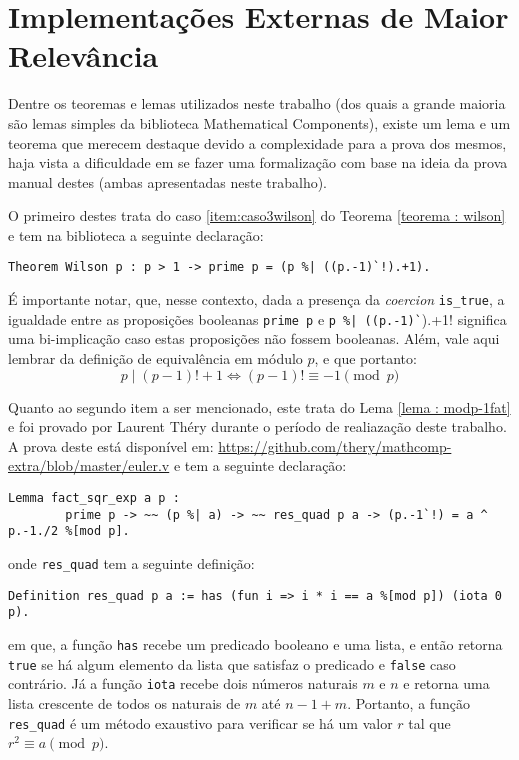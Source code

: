 \section{Implementações Externas de Maior Relevância}
Dentre os teoremas e lemas utilizados neste trabalho (dos quais a grande maioria são lemas simples da biblioteca Mathematical Components), existe um lema e um teorema que merecem destaque devido a complexidade para a prova dos mesmos, haja vista a dificuldade em se fazer uma formalização com base na ideia da prova manual destes (ambas apresentadas neste trabalho).

O primeiro destes trata do caso \ref{item:caso3wilson} do Teorema \ref{teorema : wilson} e tem na biblioteca a seguinte declaração:
\begin{lstlisting}[language=coq]
        Theorem Wilson p : p > 1 -> prime p = (p %| ((p.-1)`!).+1).
\end{lstlisting}
É importante notar, que, nesse contexto, dada a presença da \textit{coercion} \lstinline[language=coq]!is_true!, a igualdade entre as proposições booleanas \lstinline[language=coq]!prime p! e \lstinline[language=coq]!p %| ((p.-1)`!).+1! significa uma bi-implicação caso estas proposições não fossem booleanas. Além, vale aqui lembrar da definição de equivalência em módulo $p$, e que portanto:
\begin{equation}
        p \mid (p-1)! + 1 \Longleftrightarrow (p-1)! \equiv -1 \pmod{p} 
\end{equation}

Quanto ao segundo item a ser mencionado, este trata do Lema \ref{lema : modp-1fat} e foi provado por Laurent Théry durante o período de realiazação deste trabalho. A prova deste está disponível em: \hyperlink{https://github.com/thery/mathcomp-extra/blob/master/euler.v}{https://github.com/thery/mathcomp-extra/blob/master/euler.v} e tem a seguinte declaração:
\begin{lstlisting}[language=coq]
        Lemma fact_sqr_exp a p :
        prime p -> ~~ (p %| a) -> ~~ res_quad p a -> (p.-1`!) = a ^ p.-1./2 %[mod p].
\end{lstlisting}
onde \lstinline[language=coq]!res_quad! tem a seguinte definição:
\begin{lstlisting}[language=coq]
        Definition res_quad p a := has (fun i => i * i == a %[mod p]) (iota 0 p).
\end{lstlisting}
em que, a função \lstinline[language=coq]!has! recebe um predicado booleano e uma lista, e então retorna \lstinline[language=coq]!true!
se há algum elemento da lista que satisfaz o predicado e \lstinline[language=coq]!false! caso contrário. Já a função \lstinline[language=coq]!iota! recebe dois números naturais $m$ e $n$ e retorna uma lista crescente de todos os naturais de $m$ até $n-1+m$. Portanto, a função \lstinline[language=coq]!res_quad! é um método exaustivo para verificar se há um valor $r$ tal que $r^{2} \equiv a \pmod{p}$.

